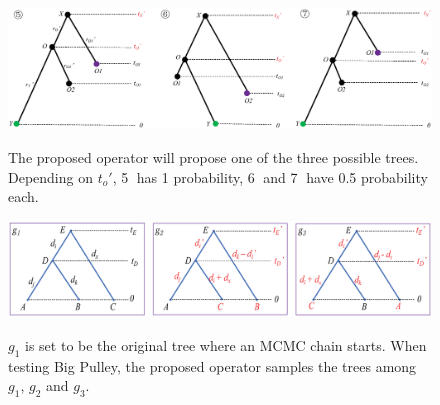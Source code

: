 \documentclass{bmcart}
\begin{document}
\begin{backmatter}
\begin{figure}[h!]
\includegraphics[width=12cm]{asymmetric.eps}\\
\caption{
             The proposed operator will propose one of the three possible trees. Depending on ${t_o}'$, \textcircled5 has 1 probability, \textcircled6 and \textcircled7 have 0.5 probability each.}
\label{asymmetric}
\end{figure}

\begin{figure}[h!]
\includegraphics[width=12cm]{bigpulleyExp.eps}\\
\caption{
             $g_1$ is set to be the original tree where an MCMC chain starts. When testing Big Pulley, the proposed operator samples the trees among $g_1$, $g_2$ and $g_3$.}
\label{sampleprior}
\end{figure}


\end{backmatter}
\end{document}
